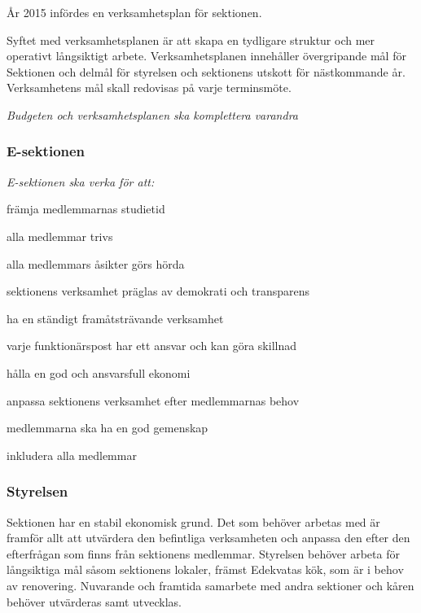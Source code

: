 \documentclass[../_main/handlingar.tex]{subfiles}
\begin{document}

År 2015 infördes en verksamhetsplan för sektionen.

Syftet med verksamhetsplanen är att skapa en tydligare struktur och mer operativt långsiktigt arbete. Verksamhetsplanen innehåller övergripande mål för Sektionen och delmål för styrelsen och sektionens utskott för nästkommande år. Verksamhetens mål skall redovisas på varje terminsmöte.

\emph{Budgeten och verksamhetsplanen ska komplettera varandra}

\subsubsection*{E-sektionen}
\emph{E-sektionen ska verka för att:}
\begin{dashlist}
    \item främja medlemmarnas studietid
    \item alla medlemmar trivs
    \item alla medlemmars åsikter görs hörda
    \item sektionens verksamhet präglas av demokrati och transparens
    \item ha en ständigt framåtsträvande verksamhet
    \item varje funktionärspost har ett ansvar och kan göra skillnad
    \item hålla en god och ansvarsfull ekonomi
    \item anpassa sektionens verksamhet efter medlemmarnas behov
    \item medlemmarna ska ha en god gemenskap
    \item inkludera alla medlemmar
\end{dashlist}

\subsubsection*{Styrelsen}
Sektionen har en stabil ekonomisk grund. Det som behöver arbetas med är framför allt att utvärdera den befintliga verksamheten och anpassa den efter den efterfrågan som finns från sektionens medlemmar. Styrelsen behöver arbeta för långsiktiga mål såsom sektionens lokaler, främst Edekvatas kök, som är i behov av renovering. Nuvarande och framtida samarbete med andra sektioner och kåren behöver utvärderas samt utvecklas.
\end{document}
